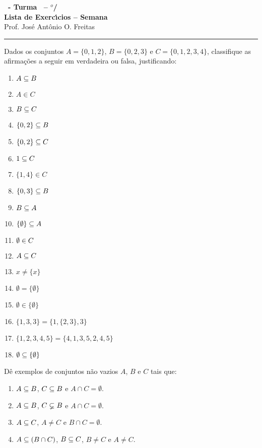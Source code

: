 \documentclass[12pt]{exam}
\begin{document}
    \begin{center}
    {\Large\bf \disciplina\ - Turma \turma\ -- \semestre$^{o}$/\ano} \\ \vspace{9pt} {\large\bf
        Lista de Exerc{\'\i}cios -- Semana \numerosemana}\\ \vspace{9pt} Prof. Jos{\'e} Ant{\^o}nio O. Freitas
    \end{center}
    \hrule

    \vspace{.6cm}

    \questao{} Dados os conjuntos $A = \{0,1,2\}$, $B = \{0,2,3\}$ e $C = \{0,1,2,3,4\}$, classifique as afirma\c{c}\~oes a seguir em verdadeira ou falsa, justificando:
    \begin{multicols}{2}
        \begin{enumerate}[label={\alph*})]
            \item $A \subseteq B$
            \item $A \in C$
            \item $B \subseteq C$
            \item $\{0,2\} \subseteq B$
            \item $\{0,2\} \subseteq C$
            \item $1 \subseteq C$
            \item $\{1,4\} \in C$
            \item $\{0,3\} \subseteq B$
            \item $B \subseteq A$
            \item $\{\emptyset\} \subseteq A$
            \item $\emptyset \in C$
            \item $A \subseteq C$
            \item $x \neq \{x\}$
            \item $\emptyset = \{\emptyset\}$
            \item $\emptyset \in \{\emptyset\}$
            \item $\{1, 3, 3\} = \{1, \{2, 3\}, 3\}$
            \item $\{1, 2, 3, 4, 5\} = \{4, 1, 3, 5, 2, 4, 5\}$
            \item $\emptyset \subseteq \{\emptyset\}$
        \end{enumerate} 
    \end{multicols}

    \questao{} D\^e exemplos de conjuntos n\~ao vazios $A$, $B$ e $C$ tais que:
    \begin{enumerate}[label={\alph*})]
        \item $A \subseteq B$, $C \subseteq B$ e $A \cap C = \emptyset$.
        \item $A \subseteq B$, $C \varsubsetneq B$ e $A \cap C = \emptyset$.
        \item $A \subseteq C$, $A \ne C$ e $B \cap C = \emptyset$.
        \item $A \subseteq (B \cap C)$, $B \subseteq C$, $B \ne C$ e $A \ne C$.
    \end{enumerate}
\end{document}
